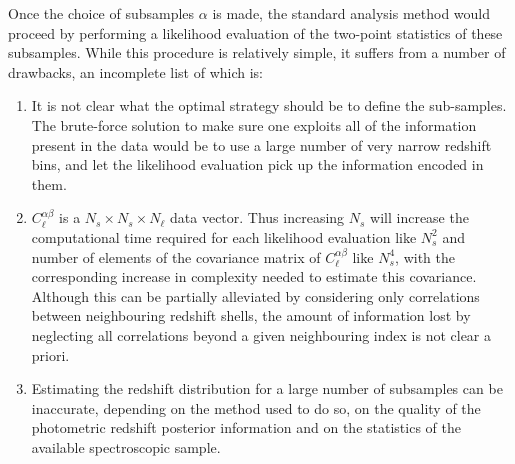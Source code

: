 \documentclass[twocolumn,amsfont,amssymb,amsmath, showpacs,balancelastpage, nofootinbib]{revtex4-1}
\begin{document}
      Once the choice of subsamples $\alpha$ is made, the standard analysis method would proceed by performing a likelihood evaluation of the two-point statistics of these subsamples. While this procedure is relatively simple, it suffers from a number of drawbacks, an incomplete list of which is:
      \begin{enumerate}
        \item It is not clear what the optimal strategy should be to define the sub-samples. The brute-force solution to make sure one exploits all of the information present in the data would be to use a large number of very narrow redshift bins, and let the likelihood evaluation pick up the information encoded in them.
        \item $C^{\alpha\beta}_\ell$ is a $N_s\times N_s\times N_\ell$ data vector. Thus increasing $N_s$ will increase the computational time required for each likelihood evaluation like $N_s^2$ and number of elements of the covariance matrix of $C^{\alpha\beta}_\ell$ like $N_s^4$, with the corresponding increase in complexity needed to estimate this covariance. Although this can be partially alleviated by considering only correlations between neighbouring redshift shells, the amount of information lost by neglecting all correlations beyond a given neighbouring index is not clear a priori.
        \item Estimating the redshift distribution for a large number of subsamples can be inaccurate, depending on the method used to do so, on the quality of the photometric redshift posterior information and on the statistics of the available spectroscopic sample.
     \end{enumerate}
  
\end{document}
